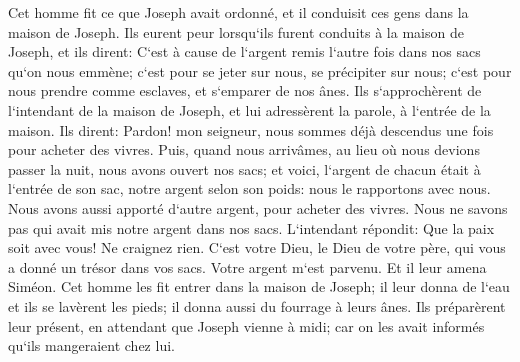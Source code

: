 \verse Cet homme fit ce que Joseph avait ordonné, et il conduisit ces gens dans la maison de Joseph. 
\verse Ils eurent peur lorsqu`ils furent conduits à la maison de Joseph, et ils dirent: C`est à cause de l`argent remis l`autre fois dans nos sacs qu`on nous emmène; c`est pour se jeter sur nous, se précipiter sur nous; c`est pour nous prendre comme esclaves, et s`emparer de nos ânes. 
\verse Ils s`approchèrent de l`intendant de la maison de Joseph, et lui adressèrent la parole, à l`entrée de la maison. 
\verse Ils dirent: Pardon! mon seigneur, nous sommes déjà descendus une fois pour acheter des vivres. 
\verse Puis, quand nous arrivâmes, au lieu où nous devions passer la nuit, nous avons ouvert nos sacs; et voici, l`argent de chacun était à l`entrée de son sac, notre argent selon son poids: nous le rapportons avec nous. 
\verse Nous avons aussi apporté d`autre argent, pour acheter des vivres. Nous ne savons pas qui avait mis notre argent dans nos sacs. 
\verse L`intendant répondit: Que la paix soit avec vous! Ne craignez rien. C`est votre Dieu, le Dieu de votre père, qui vous a donné un trésor dans vos sacs. Votre argent m`est parvenu. Et il leur amena Siméon. 
\verse Cet homme les fit entrer dans la maison de Joseph; il leur donna de l`eau et ils se lavèrent les pieds; il donna aussi du fourrage à leurs ânes. 
\verse Ils préparèrent leur présent, en attendant que Joseph vienne à midi; car on les avait informés qu`ils mangeraient chez lui. 
